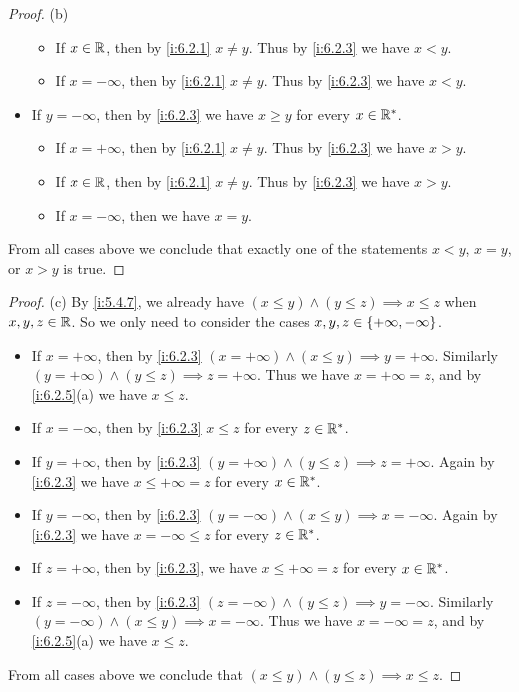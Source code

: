 \begin{proof}{(b)}
\begin{itemize}
\begin{itemize}
            \item If \(x \in \mathbb{R}\), then by \cref{i:6.2.1} \(x \neq y\).
                  Thus by \cref{i:6.2.3} we have \(x < y\).
            \item If \(x = -\infty\), then by \cref{i:6.2.1} \(x \neq y\).
                  Thus by \cref{i:6.2.3} we have \(x < y\).
          \end{itemize}
    \item If \(y = -\infty\), then by \cref{i:6.2.3} we have \(x \geq y\) for every \(x \in \mathbb{R}^*\).
          \begin{itemize}
            \item If \(x = +\infty\), then by \cref{i:6.2.1} \(x \neq y\).
                  Thus by \cref{i:6.2.3} we have \(x > y\).
            \item If \(x \in \mathbb{R}\), then by \cref{i:6.2.1} \(x \neq y\).
                  Thus by \cref{i:6.2.3} we have \(x > y\).
            \item If \(x = -\infty\), then we have \(x = y\).
          \end{itemize}
  \end{itemize}
  From all cases above we conclude that exactly one of the statements \(x < y\), \(x = y\), or \(x > y\) is true.
\end{proof}

\begin{proof}{(c)}
  By \cref{i:5.4.7}, we already have \((x \leq y) \land (y \leq z) \implies x \leq z\) when \(x, y, z \in \mathbb{R}\).
  So we only need to consider the cases \(x, y, z \in \left\lbrace+\infty, -\infty\right\rbrace\).
  \begin{itemize}
    \item If \(x = +\infty\), then by \cref{i:6.2.3} \((x = +\infty) \land (x \leq y) \implies y = +\infty\).
          Similarly \((y = +\infty) \land (y \leq z) \implies z = +\infty\).
          Thus we have \(x = +\infty = z\), and by \cref{i:6.2.5}(a) we have \(x \leq z\).
    \item If \(x = -\infty\), then by \cref{i:6.2.3} \(x \leq z \) for every \(z \in \mathbb{R}^*\).
    \item If \(y = +\infty\), then by \cref{i:6.2.3} \((y = +\infty) \land (y \leq z) \implies z = +\infty\).
          Again by \cref{i:6.2.3} we have \(x \leq +\infty = z\) for every \(x \in \mathbb{R}^*\).
    \item If \(y = -\infty\), then by \cref{i:6.2.3} \((y = -\infty) \land (x \leq y) \implies x = -\infty\).
          Again by \cref{i:6.2.3} we have \(x = -\infty \leq z\) for every \(z \in \mathbb{R}^*\).
    \item If \(z = +\infty\), then by \cref{i:6.2.3}, we have \(x \leq +\infty = z\) for every \(x \in \mathbb{R}^*\).
    \item If \(z = -\infty\), then by \cref{i:6.2.3} \((z = -\infty) \land (y \leq z) \implies y = -\infty\).
          Similarly \((y = -\infty) \land (x \leq y) \implies x = -\infty\).
          Thus we have \(x = -\infty = z\), and by \cref{i:6.2.5}(a) we have \(x \leq z\).
  \end{itemize}
  From all cases above we conclude that \((x \leq y) \land (y \leq z) \implies x \leq z\).
\end{proof}

